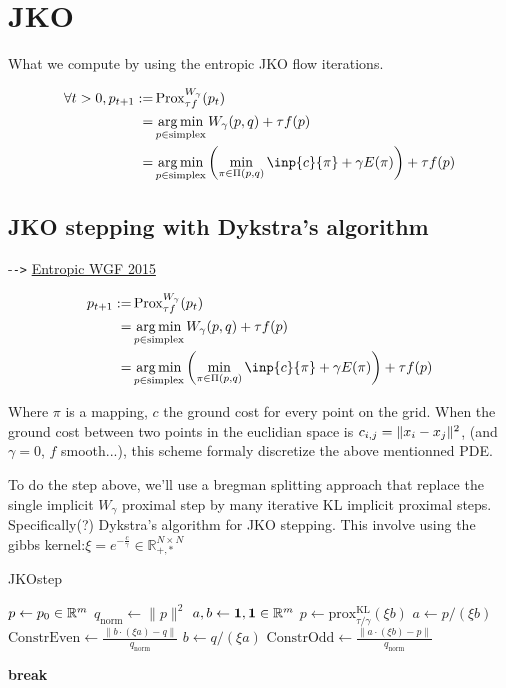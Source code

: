 \section{JKO}

What we compute by using the entropic JKO flow iterations.

\begin{align}
	\forall t > 0, p_{t+1} := & \prox^{W_{\gamma}}_{\tau f}(p_t) \\
							= & \argmin_{p \in \text{simplex}} W_{\gamma}(p, q) + \tau f(p) \\
							= &\argmin_{p \in \text{simplex}}  \left( \min_{\pi \in \Pi(p, q)} \inp{c}{\pi} + \gamma E(\pi) \right) + \tau f(p)
\end{align}

\subsection{JKO stepping with Dykstra's algorithm}

-\verb|->| \href{https://arxiv.org/pdf/1502.06216.pdf}{Entropic WGF 2015}

\begin{align}
p_{t+1} := & \prox^{W_{\gamma}}_{\tau f}(p_t) \\
							= & \argmin_{p \in \text{simplex}} W_{\gamma}(p, q) + \tau f(p) \\
							= &\argmin_{p \in \text{simplex}}  \left( \min_{\pi \in \Pi(p, q)} \inp{c}{\pi} + \gamma E(\pi) \right) + \tau f(p)
\end{align}

Where $\pi$ is a mapping, $c$ the ground cost for every point on the grid. When the ground cost between two points in the euclidian space is $c_{i,j} = \lVert x_i- x_j\rVert^2$, (and $\gamma=0$, $f$ smooth...), this scheme formaly discretize the above mentionned PDE.

To do the step above, we'll use a bregman splitting approach that replace the single implicit $W_\gamma$ proximal step by many iterative KL implicit proximal steps. Specifically(?) Dykstra's algorithm for JKO stepping. This involve using the gibbs kernel:$\xi = e^{-\frac{c}{\gamma}} \in \mathbb{R}^{N \times N}_{+, \ast}$


\begin{algorithm}
\caption{JKOstep}
\begin{algorithmic}[1]
\State $p \gets p_0 \in \mathbb{R}^m$
\State $q_{\text{norm}} \gets \lVert p \rVert^2$
\State $a, b \gets \mathbf{1}, \mathbf{1} \in \mathbb{R}^m$ 
\State $p \gets \text{prox}^{\text{KL}}_{\tau/\gamma}(\xi b)$
    \State $a \gets p / (\xi b)$
    \State $\text{ConstrEven} \gets \frac{\lVert b \cdot (\xi a) - q \rVert}{q_{\text{norm}}}$
    \State $b \gets q / (\xi a)$
    \State $\text{ConstrOdd} \gets \frac{\lVert a \cdot (\xi b) - p \rVert}{q_{\text{norm}}}$
    
        \State \textbf{break}
    \EndIf
\EndFor
\end{algorithmic}
\end{algorithm}

